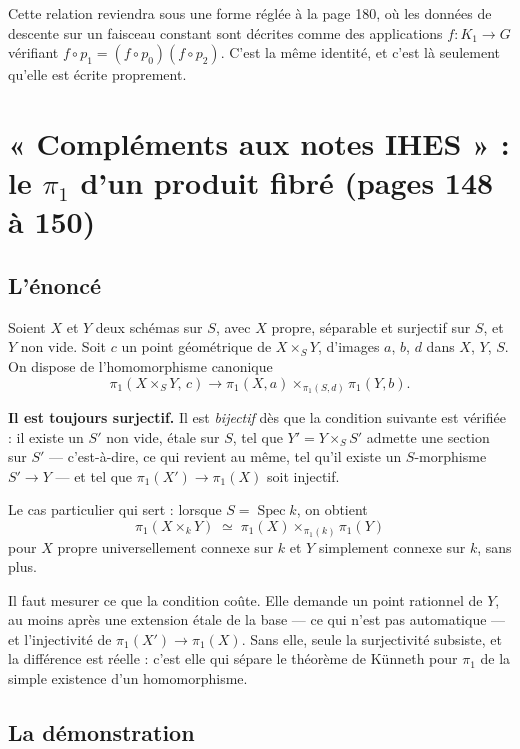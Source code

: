 \documentclass[11pt,a4paper]{article}
\begin{document}
Cette relation reviendra sous une forme réglée à la page 180, où les données de
descente sur un faisceau constant sont décrites comme des applications
$f : K_{1} \to G$ vérifiant $f \circ p_{1} = (f \circ p_{0})(f \circ p_{2})$.
C'est la même identité, et c'est là seulement qu'elle est écrite proprement.

\section*{« Compléments aux notes IHES » : le $\pi_{1}$ d'un produit fibré (pages 148 à 150)}

\subsection*{L'énoncé}

Soient $X$ et $Y$ deux schémas sur $S$, avec $X$ propre, séparable et surjectif
sur $S$, et $Y$ non vide. Soit $c$ un point géométrique de $X \times_{S} Y$,
d'images $a$, $b$, $d$ dans $X$, $Y$, $S$. On dispose de l'homomorphisme
canonique
\[
  \pi_{1}(X \times_{S} Y,\, c) \longrightarrow
  \pi_{1}(X, a) \times_{\pi_{1}(S, d)} \pi_{1}(Y, b) .
\]

\textbf{Il est toujours surjectif.} Il est \emph{bijectif} dès que la condition
suivante est vérifiée : il existe un $S'$ non vide, étale sur $S$, tel que
$Y' = Y \times_{S} S'$ admette une section sur $S'$ --- c'est-à-dire, ce qui
revient au même, tel qu'il existe un $S$-morphisme $S' \to Y$ --- et tel que
$\pi_{1}(X') \to \pi_{1}(X)$ soit injectif.

Le cas particulier qui sert : lorsque $S = \operatorname{Spec} k$, on obtient
\[
  \pi_{1}(X \times_{k} Y) \;\simeq\; \pi_{1}(X) \times_{\pi_{1}(k)}
  \pi_{1}(Y)
\]
pour $X$ propre universellement connexe sur $k$ et $Y$ simplement connexe sur
$k$, sans plus.

Il faut mesurer ce que la condition coûte. Elle demande un point rationnel de
$Y$, au moins après une extension étale de la base --- ce qui n'est pas
automatique --- et l'injectivité de $\pi_{1}(X') \to \pi_{1}(X)$. Sans elle,
seule la surjectivité subsiste, et la différence est réelle : c'est elle qui
sépare le théorème de Künneth pour $\pi_{1}$ de la simple existence d'un
homomorphisme.

\subsection*{La démonstration}
\end{document}
